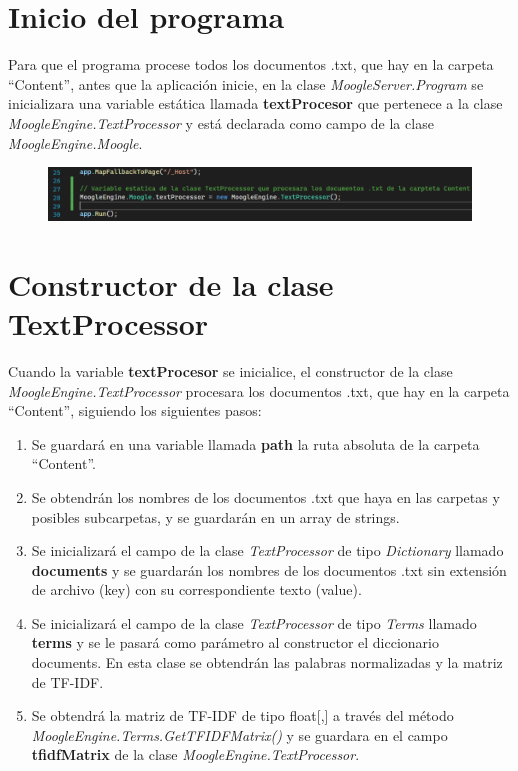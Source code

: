 \documentclass[a4paper,12pt]{report}
\begin{document}
\section*{Inicio del programa} 

Para que el programa procese todos los documentos .txt, que hay en la carpeta “Content”, antes que
la aplicación inicie, en la clase \textit{MoogleServer.Program} se inicializara una variable estática llamada
\textbf{textProcesor} que pertenece a la clase \textit{MoogleEngine.TextProcessor} y está declarada como campo de
la clase \textit{MoogleEngine.Moogle}.

\begin{figure}[h]
    \includegraphics*[width=16cm]{fotos/01 - Inicio de la aplicacion.png}
\end{figure}

\section*{Constructor de la clase TextProcessor}

Cuando la variable \textbf{textProcesor} se inicialice, el constructor de la clase 
\textit{MoogleEngine.TextProcessor} procesara los documentos .txt, que hay en la carpeta “Content”, 
siguiendo los siguientes pasos:

\begin{enumerate}
    \item Se guardará en una variable llamada \textbf{path} la ruta absoluta de la carpeta “Content”.
    \item Se obtendrán los nombres de los documentos .txt que haya en las carpetas y posibles subcarpetas, 
    y se guardarán en un array de strings.
    \item Se inicializará el campo de la clase \textit{TextProcessor} de tipo \textit{Dictionary} 
    llamado \textbf{documents} y se guardarán los nombres de los documentos .txt sin extensión 
    de archivo (key) con su correspondiente texto (value).
    \item Se inicializará el campo de la clase \textit{TextProcessor} de tipo \textit{Terms} llamado \textbf{terms} 
    y se le pasará como parámetro al constructor el diccionario documents. En esta clase se obtendrán las
    palabras normalizadas y la matriz de TF-IDF.
    \item Se obtendrá la matriz de TF-IDF de tipo float[,] a través del método
    \textit{MoogleEngine.Terms.GetTFIDFMatrix()} y se guardara en el campo \textbf{tfidfMatrix} de la clase
    \textit{MoogleEngine.TextProcessor}.

\end{enumerate}
\end{document}
